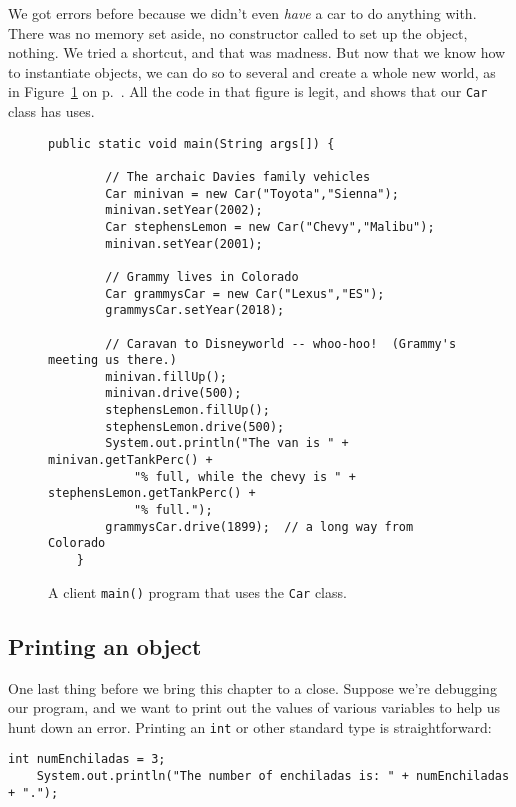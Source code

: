 We got errors before because we didn't even \textit{have} a car to do anything
with. There was no memory set aside, no constructor called to set up the
object, nothing. We tried a shortcut, and that was madness. But now that we
know how to instantiate objects, we can do so to several and create a whole
new world, as in Figure~\ref{fig:wholeNewWorld} on
p.~\pageref{fig:wholeNewWorld}. All the code in that figure is legit, and
shows that our \texttt{Car} class has uses.

\begin{figure}[h]
\centering
\begin{Verbatim}[samepage=true,fontsize=\footnotesize,frame=single]
    public static void main(String args[]) {

        // The archaic Davies family vehicles
        Car minivan = new Car("Toyota","Sienna");
        minivan.setYear(2002);
        Car stephensLemon = new Car("Chevy","Malibu");
        minivan.setYear(2001);

        // Grammy lives in Colorado
        Car grammysCar = new Car("Lexus","ES");
        grammysCar.setYear(2018);

        // Caravan to Disneyworld -- whoo-hoo!  (Grammy's meeting us there.)
        minivan.fillUp();
        minivan.drive(500);
        stephensLemon.fillUp();
        stephensLemon.drive(500);
        System.out.println("The van is " + minivan.getTankPerc() + 
            "% full, while the chevy is " + stephensLemon.getTankPerc() +
            "% full.");
        grammysCar.drive(1899);  // a long way from Colorado
    }
\end{Verbatim}
\caption{A client \texttt{main()} program that uses the \texttt{Car} class.}
\label{fig:wholeNewWorld}
\end{figure}


\subsection{Printing an object}

One last thing before we bring this chapter to a close. Suppose we're
debugging our program, and we want to print out the values of various
variables to help us hunt down an error. Printing an \texttt{int} or other
standard type is straightforward:

\begin{Verbatim}[samepage=true,fontsize=\scriptsize,frame=single]
    int numEnchiladas = 3;
    System.out.println("The number of enchiladas is: " + numEnchiladas + ".");
\end{Verbatim}

